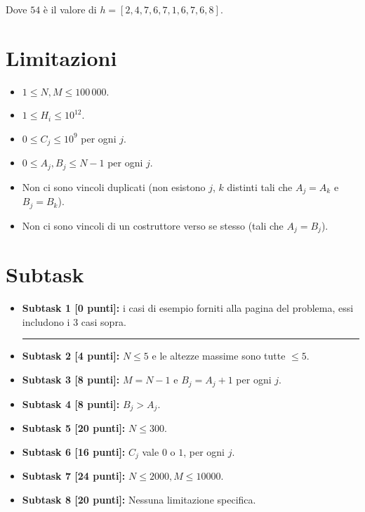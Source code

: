 Dove $54$ è il valore di $h=[2, 4, 7, 6, 7, 1, 6, 7, 6, 8]$.


\section*{Limitazioni}

\begin{itemize}[nolistsep, itemsep=2mm]
	\item $1 \le N, M \le 100\,000$.
	\item $1 \le H_i \le 10^{12}$.
	\item $0 \leq C_j \le 10^9$ per ogni $j$.
	\item $0 \leq A_j, B_j \leq N - 1$ per ogni $j$.
	\item Non ci sono vincoli duplicati (non esistono $j$, $k$ distinti tali che
	      $A_j = A_k$ e $B_j = B_k$).
	\item Non ci sono vincoli di un costruttore verso se stesso (tali che $A_j =
	      B_j$).
\end{itemize}

\section*{Subtask}

  \begin{itemize}
  \item \textbf{Subtask 1 [\phantom{1}0 punti]:} i casi di esempio forniti alla pagina del problema, essi includono i 3 casi sopra.
      \vspace{-0.6cm}
       \begin{center}
      \rule{0.5\textwidth}{0.4pt} \hfill  \hfill \hfill
       \end{center}
      \vspace{-0.6cm}      
    \item \textbf{Subtask 2 [\phantom{1}4 punti]:} $N \leq 5$ e le altezze massime sono tutte $\leq 5$.
    \item \textbf{Subtask 3 [\phantom{1}8 punti]:} $M = N - 1$ e $B_j = A_j + 1$ per ogni $j$.
    \item \textbf{Subtask 4 [\phantom{1}8 punti]:} $B_j > A_j$.
    \item \textbf{Subtask 5 [20 punti]:} $N \leq 300$.
    \item \textbf{Subtask 6 [16 punti]:} $C_j$ vale $0$ o $1$, per ogni $j$.
    \item \textbf{Subtask 7 [24 punti]:} $N \leq 2000, M \leq 10000$.
    \item \textbf{Subtask 8 [20 punti]:} Nessuna limitazione specifica.
  \end{itemize}

